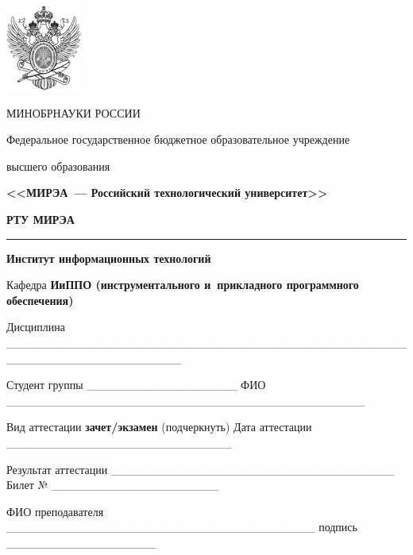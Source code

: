 \documentclass[12pt, a4paper]{extarticle}
\begin{document}
\fontsize{12pt}{1.08}\selectfont

\begin{center}
\includegraphics[width=0.97917in,height=1.10417in]{Images/mirea.png}

\setlength{\parskip}{6pt}
МИНОБРНАУКИ РОССИИ 

Федеральное государственное бюджетное образовательное учреждение
\setlength{\parskip}{0pt}

высшего образования

\textbf{<<МИРЭА~--- Российский технологический университет>>}

\fontsize{16pt}{1.08}\selectfont
\textbf{РТУ МИРЭА}

\setlength{\parskip}{6pt}
\noindent\rule{\textwidth}{2pt}

\bigskip

\fontsize{14pt}{1.08}\selectfont
\textbf{Институт информационных технологий}

\setlength{\parskip}{0pt}
\fontsize{12pt}{1.08}\selectfont

\bigskip

\end{center}

\justifying

\setlength{\parindent}{0in}

Кафедра \textbf{ИиППО (инструментального и~прикладного программного
обеспечения)}

\medskip

Дисциплина
\_\_\_\_\_\_\_\_\_\_\_\_\_\_\_\_\_\_\_\_\_\_\_\_\_\_\_\_\_\_\_\_\_\_\_\_\_\_\_\_\_\_\_\_\_\_\_\_\_\_\_\_\_\_\_\_\_\_\_\_\_\_\_\_\_\_\_\_\_

\medskip

Студент группы \_\_\_\_\_\_\_\_\_\_\_\_\_\_\_\_\_\_ ФИО
\_\_\_\_\_\_\_\_\_\_\_\_\_\_\_\_\_\_\_\_\_\_\_\_\_\_\_\_\_\_\_\_\_\_\_\_\_\_\_\_\_\_\_


\medskip

Вид аттестации \textbf{зачет/экзамен} (подчеркнуть) Дата аттестации
\_\_\_\_\_\_\_\_\_\_\_\_\_\_\_\_\_\_\_\_\_\_\_\_\_\_\_


\medskip

Результат аттестации
\_\_\_\_\_\_\_\_\_\_\_\_\_\_\_\_\_\_\_\_\_\_\_\_\_\_\_\_\_\_\_\_\_\_
Билет № \_\_\_\_\_\_\_\_\_\_\_\_\_\_\_\_\_\_\_\_


\medskip

ФИО преподавателя
\_\_\_\_\_\_\_\_\_\_\_\_\_\_\_\_\_\_\_\_\_\_\_\_\_\_\_\_\_\_\_\_\_\_\_\_\_
подпись \_\_\_\_\_\_\_\_\_\_\_\_\_\_\_\_\_\_
\end{document}
